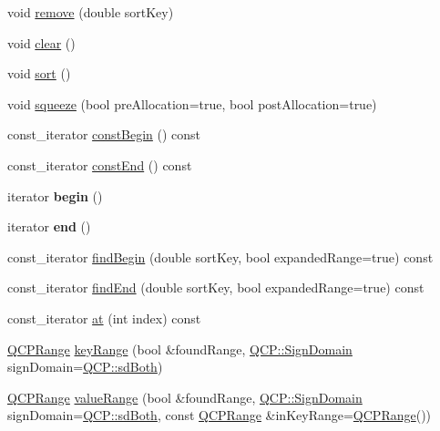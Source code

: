 \begin{DoxyCompactItemize}
\item 
void \hyperlink{class_q_c_p_data_container_a2dbded7f0732bacf9db48fdfbbb620bc}{remove} (double sort\+Key)
\item 
void \hyperlink{class_q_c_p_data_container_a7e2b29736c6fd761649bda1a54ba967f}{clear} ()
\item 
void \hyperlink{class_q_c_p_data_container_a75da92e33063b63d6da5014683591d45}{sort} ()
\item 
void \hyperlink{class_q_c_p_data_container_a82fcc511def22287fc62579d0706387c}{squeeze} (bool pre\+Allocation=true, bool post\+Allocation=true)
\item 
const\+\_\+iterator \hyperlink{class_q_c_p_data_container_a49d7622999e2de67fa2331626a3159aa}{const\+Begin} () const
\item 
const\+\_\+iterator \hyperlink{class_q_c_p_data_container_aa7f7cf239b85b1a28de3d675cc5b3da1}{const\+End} () const
\item 
\mbox{\label{class_q_c_p_data_container_a58c6f18e40003df1759ef571b485d720}} 
iterator {\bfseries begin} ()
\item 
\mbox{\label{class_q_c_p_data_container_a3c7d450cdad10302e6102f7fe064223c}} 
iterator {\bfseries end} ()
\item 
const\+\_\+iterator \hyperlink{class_q_c_p_data_container_a2ad8a5399072d99a242d3a6d2d7e278a}{find\+Begin} (double sort\+Key, bool expanded\+Range=true) const
\item 
const\+\_\+iterator \hyperlink{class_q_c_p_data_container_afb8b8f23cc2b7234a793a25ce79fe48f}{find\+End} (double sort\+Key, bool expanded\+Range=true) const
\item 
const\+\_\+iterator \hyperlink{class_q_c_p_data_container_ae90c7457a052b223539906e6bddc0a92}{at} (int index) const
\item 
\hyperlink{class_q_c_p_range}{Q\+C\+P\+Range} \hyperlink{class_q_c_p_data_container_aba6e1a93c21ccc56a432b4a02c9d0ed2}{key\+Range} (bool \&found\+Range, \hyperlink{namespace_q_c_p_afd50e7cf431af385614987d8553ff8a9}{Q\+C\+P\+::\+Sign\+Domain} sign\+Domain=\hyperlink{namespace_q_c_p_afd50e7cf431af385614987d8553ff8a9a3dee7e9cd2fedce9253b83e172626a6c}{Q\+C\+P\+::sd\+Both})
\item 
\hyperlink{class_q_c_p_range}{Q\+C\+P\+Range} \hyperlink{class_q_c_p_data_container_a35a102dc2424d1228fc374d9313efbe9}{value\+Range} (bool \&found\+Range, \hyperlink{namespace_q_c_p_afd50e7cf431af385614987d8553ff8a9}{Q\+C\+P\+::\+Sign\+Domain} sign\+Domain=\hyperlink{namespace_q_c_p_afd50e7cf431af385614987d8553ff8a9a3dee7e9cd2fedce9253b83e172626a6c}{Q\+C\+P\+::sd\+Both}, const \hyperlink{class_q_c_p_range}{Q\+C\+P\+Range} \&in\+Key\+Range=\hyperlink{class_q_c_p_range}{Q\+C\+P\+Range}())

\end{DoxyCompactItemize}
